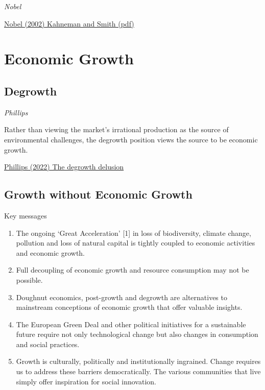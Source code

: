 \documentclass[
]{book}
\providecommand{\tightlist}{%
  \setlength{\itemsep}{0pt}\setlength{\parskip}{0pt}}
\begin{document}
\emph{Nobel}

\href{pdf/Nobel_2002_Kahneman_and_Smith.pdf}{Nobel (2002) Kahneman and Smith (pdf)}

\hypertarget{economic-growth}{%
\chapter{Economic Growth}\label{economic-growth}}

\hypertarget{degrowth}{%
\section{Degrowth}\label{degrowth}}

\emph{Phillips}

Rather than viewing the market's irrational production as the source of environmental challenges, the degrowth position views the source to be economic growth.

\href{https://www.opendemocracy.net/en/oureconomy/degrowth-delusion/}{Phillips (2022) The degrowth delusion}

\hypertarget{growth-without-economic-growth}{%
\section{Growth without Economic Growth}\label{growth-without-economic-growth}}

Key messages

\begin{enumerate}
\def\labelenumi{\arabic{enumi}.}
\tightlist
\item
  The ongoing `Great Acceleration' {[}1{]} in loss of biodiversity, climate change, pollution and loss of natural capital is tightly coupled to economic activities and economic growth.
\item
  Full decoupling of economic growth and resource consumption may not be possible.
\item
  Doughnut economics, post-growth and degrowth are alternatives to mainstream conceptions of economic growth that offer valuable insights.
\item
  The European Green Deal and other political initiatives for a sustainable future require not only technological change but also changes in consumption and social practices.
\item
  Growth is culturally, politically and institutionally ingrained. Change requires us to address these barriers democratically. The various communities that live simply offer inspiration for social innovation.
\end{enumerate}
\end{document}
